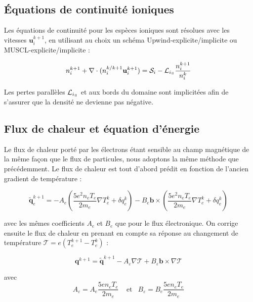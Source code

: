 \begin{refsection}
\subsection{Équations de continuité ioniques}
Les équations de continuité pour les espèces ioniques sont résolues avec les
vitesses $\mathbf u_i^{k+1}$, en utilisant au choix un schéma
Upwind-explicite/implicite ou MUSCL-explicite/implicite :

\begin{equation}
n_i^{k+1}+\nabla\cdot(n_i^{k/k+1}\mathbf u_i^{k+1})=\mathcal S_i-\mathcal
L_{i_\para}\frac{n_i^{k+1}}{n_i^k}
\end{equation}

Les pertes parallèles $\mathcal {L}_{i_\para}$ et aux bords du
domaine sont implicitées afin de s'assurer que la densité ne devienne pas
négative.

\subsection{Flux de chaleur et équation d'énergie}

Le flux de chaleur porté par les électrons étant sensible au champ magnétique de
la même façon que le flux de particules, nous adoptons la même méthode que
précédemment. Le flux de chaleur est tout d'abord prédit en fonction de
l'ancien gradient de température :

\begin{equation}
\label{3-eqChaleurPonderee}
\tilde{\mathbf{q}}_e^{k+1}=-A_e(
\frac{5e^2n_eT_e}{2m_e}\nabla T_e^k+\delta q_e^k)-B_e\mathbf
b\times(\frac{5e^2n_eT_e}{2m_e}\nabla T_e^k +\delta q_e^k)
\end{equation}

avec les mêmes coefficients $A_e$ et $B_e$ que pour le flux électronique. On
corrige ensuite le flux de chaleur en prenant en compte sa réponse au changement
de température $\mathcal T=e(T_e^{k+1}-T_e^k)$ :

\begin{equation}
\label{3-eqCorrectionVitesse}
\mathbf q^{k+1} = \tilde{\mathbf q}^{k+1}-A_\varepsilon\nabla
\mathcal T+B_\varepsilon\mathbf b\times\nabla
\mathcal T
\end{equation}

avec 
\begin{equation*}
\label{3-coefficientsChaleur}
A_\varepsilon=A_e\frac{5en_eT_e}{2m_e}\;\;\;\;\text{et}\;\;\;B_\varepsilon=B_e\frac{5en_eT_e}{2m_e}
\end{equation*}


\end{refsection}
